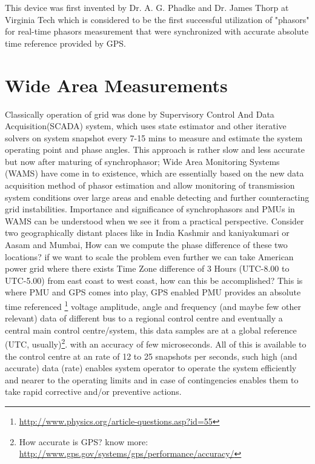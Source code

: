 This device was first invented by Dr. A. G. Phadke and Dr. James Thorp at Virginia Tech which is considered to be the first successful utilization of "phasors" for real-time phasors measurement that were synchronized with accurate absolute time reference provided by GPS.

\section{Wide Area Measurements}

Classically operation of grid was done by Supervisory Control And Data Acquisition(SCADA) system, which uses state estimator and other iterative solvers on system snapshot every 7-15 mins to measure and estimate the system operating point and phase angles. This approach is rather slow and less accurate but now after maturing of synchrophasor; Wide Area Monitoring Systems (WAMS) have come in to existence, which are essentially based on the new data acquisition method of phasor estimation and allow monitoring of transmission system conditions over large areas and enable detecting and further counteracting grid instabilities. Importance and significance of synchrophasors and PMUs in WAMS can be understood when we see it from a practical perspective. Consider two geographically distant places like in India Kashmir and kaniyakumari or Aasam and Mumbai, How can we compute the phase difference of these two locations? if we want to scale the problem even further we can take American power grid where there exists Time Zone difference of 3 Hours (UTC-8.00 to UTC-5.00) from east coast to west coast, how can this be accomplished? This is where PMU and GPS comes into play, GPS enabled PMU provides an absolute time referenced \footnote{\url{http://www.physics.org/article-questions.asp?id=55}} voltage amplitude, angle and frequency (and maybe few other relevant) data of different bus to a regional control centre and eventually a central main control centre/system, this data samples are at a global reference (UTC, usually)\footnote{How accurate is GPS? know more: \url{http://www.gps.gov/systems/gps/performance/accuracy/}}. with an accuracy of few microseconds. All of this is available to the control centre at an rate of 12 to 25 snapshots per seconds, such high (and accurate) data (rate) enables system operator to operate the system efficiently and nearer to the operating limits and in case of contingencies enables them to take rapid corrective and/or preventive actions.

